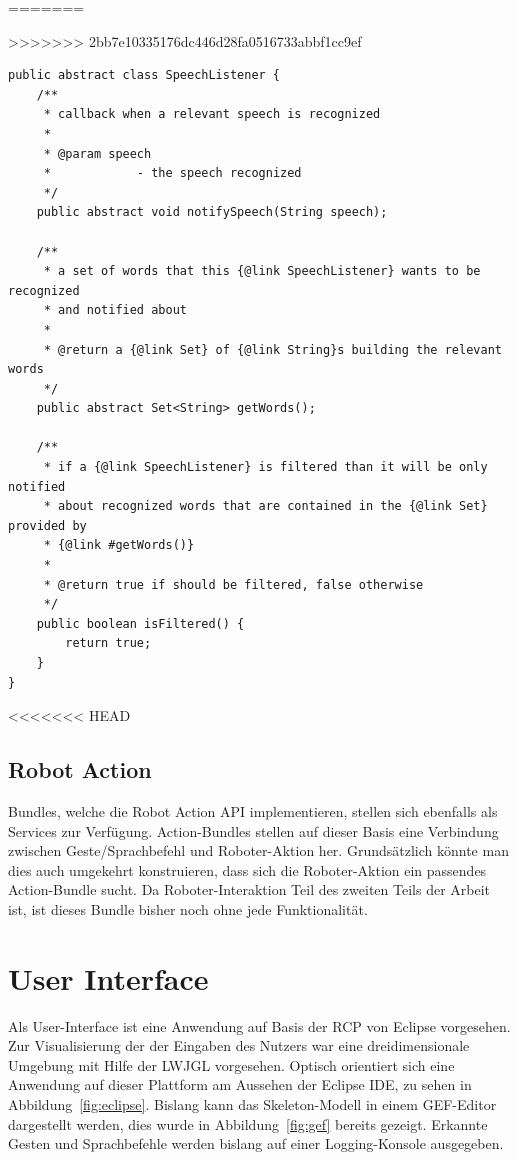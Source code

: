\par\smallskip
\lstset{language=Java}
=======

\lstset{language=Java,
 basicstyle=\footnotesize, 
 numbers=left,
 captionpos=b,
 showspaces=false,             
 showstringspaces=false,}
>>>>>>> 2bb7e10335176dc446d28fa0516733abbf1cc9ef
\begin{lstlisting}[caption={Klasse SpeechListener}, label={listing:SpeechListener}]
public abstract class SpeechListener {
	/**
	 * callback when a relevant speech is recognized
	 * 
	 * @param speech
	 *            - the speech recognized
	 */
	public abstract void notifySpeech(String speech);

	/**
	 * a set of words that this {@link SpeechListener} wants to be recognized
	 * and notified about
	 * 
	 * @return a {@link Set} of {@link String}s building the relevant words
	 */
	public abstract Set<String> getWords();

	/**
	 * if a {@link SpeechListener} is filtered than it will be only notified
	 * about recognized words that are contained in the {@link Set} provided by
	 * {@link #getWords()}
	 * 
	 * @return true if should be filtered, false otherwise
	 */
	public boolean isFiltered() {
		return true;
	}
}
\end{lstlisting}
<<<<<<< HEAD
\par\smallskip

\subsection{Robot Action}
\label{subsec:Roboterschnittstelle}

Bundles, welche die Robot Action \acrshort{API} implementieren, stellen sich ebenfalls als Services zur Verf\"ugung. Action-Bundles stellen auf dieser 
Basis eine Verbindung zwischen Geste/Sprachbefehl und Roboter-Aktion her. Grunds\"atzlich k\"onnte man dies auch umgekehrt konstruieren, dass
sich die Roboter-Aktion ein passendes Action-Bundle sucht. Da Roboter-Interaktion Teil des zweiten Teils der Arbeit ist, ist dieses Bundle 
bisher noch ohne jede Funktionalit\"at.

\section{User Interface}

Als User-Interface ist eine Anwendung auf Basis der \gls{RCP} von Eclipse vorgesehen. Zur Visualisierung der 
der Eingaben des Nutzers war eine dreidimensionale Umgebung mit Hilfe der \gls{LWJGL} vorgesehen. 
Optisch orientiert sich eine Anwendung auf dieser Plattform am Aussehen der Eclipse IDE, zu sehen in Abbildung~\ref{fig:eclipse}. 
Bislang kann das Skeleton-Modell in einem GEF-Editor dargestellt werden, dies wurde in Abbildung~\ref{fig:gef} bereits gezeigt. Erkannte Gesten und Sprachbefehle werden bislang auf einer Logging-Konsole
ausgegeben.

